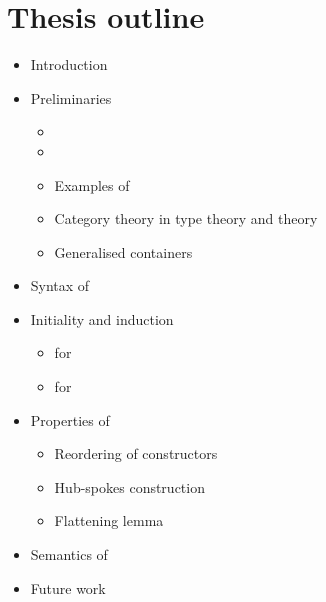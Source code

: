 \documentclass[a4paper,10pt]{report}
\begin{document}

\chapter{Thesis outline}
\label{sec:outline}

\begin{itemize}
\item Introduction
\item Preliminaries
  \begin{itemize}
  \item \mltt
  \item \Hott
  \item Examples of \hits
  \item Category theory in type theory and \omegacat theory
  \item Generalised containers
  \end{itemize}
\item Syntax of \hits
\item Initiality and induction
  \begin{itemize}
  \item for \oits
  \item for \hits
  \end{itemize}
\item Properties of \hits
  \begin{itemize}
  \item Reordering of constructors
  \item Hub-spokes construction
  \item Flattening lemma
  \end{itemize}
\item Semantics of \hits
\item Future work
\end{itemize}

\newpage
\todototoc
\listoftodos


\end{document}
